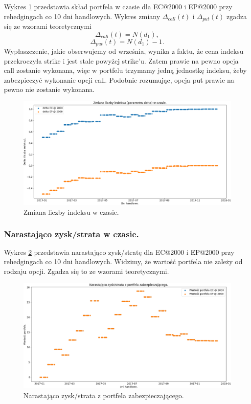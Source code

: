 \documentclass[12pt]{article}
\begin{document}
Wykres \ref{fig:sklad_portfela} przedstawia skład portfela w czasie dla EC@2000 i EP@2000 przy rehedgingach co 10 dni handlowych.  Wykres zmiany $\Delta_{call}(t)$ i $\Delta_{put}(t) $ zgadza się ze wzorami teoretycznymi
$$
\Delta_{call}(t) = N(d_1),
$$
$$
\Delta_{put}(t) = N(d_1) - 1.
$$
Wypłaszczenie, jakie obserwujemy od września, wynika z faktu, że cena indeksu przekroczyła strike i jest stale powyżej strike'u. Zatem prawie na pewno opcja call zostanie wykonana, więc w portfelu trzymamy jedną jednostkę indeksu, żeby zabezpieczyć wykonanie opcji call.  Podobnie rozumując, opcja put prawie na pewno nie zostanie wykonana.
\begin{figure}[htp]
    \centering
    \includegraphics[width=\textwidth,height=\textheight,keepaspectratio]{sklad_portfela_w_czasie.png}
    \caption{Zmiana liczby indeksu w czasie.}
    \label{fig:sklad_portfela}
\end{figure}

\subsubsection{Narastająco zysk/strata w czasie.}

Wykres \ref{fig:narastajaco_wartosc} przedstawia narastająco zysk/stratę dla EC@2000 i EP@2000 przy rehedgingach co 10 dni handlowych. Widzimy, że wartość portfela nie zależy od rodzaju opcji.  Zgadza się to ze wzorami teoretycznymi. 

\begin{figure}[H]
    \centering
    \includegraphics[width=\textwidth,height=\textheight,keepaspectratio]{narastajaco_zysk_delta_hedge.png}
    \caption{Narastająco zysk/strata z portfela zabezpieczającego.}
    \label{fig:narastajaco_wartosc}
\end{figure}
\end{document}
